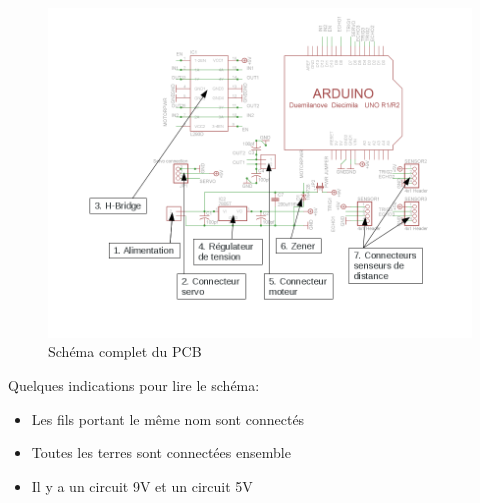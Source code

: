 \documentclass[a4paper,11pt]{report}
\begin{document}
{\begin{enumerate}
\begin{enumerate}
\begin{figure}[h!]
\centering
\includegraphics[angle=90, width=1.1\textwidth]{schema_CHI_annotated.png}
\caption{\label{schemaChineComplet}Schéma complet du PCB
}
\end{figure}

Quelques indications pour lire le schéma:

\begin{itemize}
\item Les fils portant le même nom sont connectés
\item Toutes les terres sont connectées ensemble
\item Il y a un circuit 9V et un circuit 5V
\end{itemize}


\end{enumerate}
\end{enumerate}}
\end{document}
